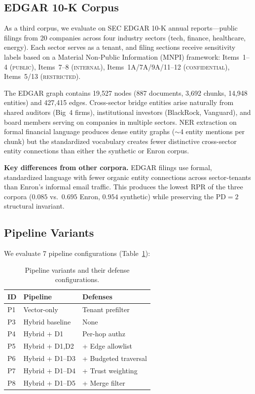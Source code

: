 \documentclass[letterpaper,twocolumn,10pt]{article}
\begin{document}
\subsection{EDGAR 10-K Corpus}
\label{sec:edgar}

As a third corpus, we evaluate on SEC EDGAR 10-K annual reports---public
filings from 20 companies across four industry sectors (tech, finance,
healthcare, energy). Each sector serves as a tenant, and filing sections
receive sensitivity labels based on a Material Non-Public Information
(MNPI) framework: Items~1--4 (\textsc{public}), Items~7--8
(\textsc{internal}), Items~1A/7A/9A/11--12 (\textsc{confidential}),
Items~5/13 (\textsc{restricted}).

The EDGAR graph contains 19{,}527 nodes (887 documents, 3{,}692 chunks,
14{,}948 entities) and 427{,}415 edges. Cross-sector bridge entities
arise naturally from shared auditors (Big~4 firms), institutional
investors (BlackRock, Vanguard), and board members serving on companies
in multiple sectors. NER extraction on formal financial language produces
dense entity graphs ($\sim$4 entity mentions per chunk) but the
standardized vocabulary creates fewer distinctive cross-sector entity
connections than either the synthetic or Enron corpus.

\textbf{Key differences from other corpora.} EDGAR filings use formal,
standardized language with fewer organic entity connections across
sector-tenants than Enron's informal email traffic. This produces the
lowest RPR of the three corpora ($0.085$ vs.\ $0.695$ Enron, $0.954$
synthetic) while preserving the $\text{PD} = 2$ structural invariant.

\subsection{Pipeline Variants}

We evaluate 7 pipeline configurations (Table~\ref{tab:variants}):

\begin{table}[t]
\centering
\caption{Pipeline variants and their defense configurations.}
\label{tab:variants}
\small
\begin{tabular}{l|l|l}
\toprule
\textbf{ID} & \textbf{Pipeline} & \textbf{Defenses} \\
\midrule
P1 & Vector-only & Tenant prefilter \\
P3 & Hybrid baseline & None \\
P4 & Hybrid + D1 & Per-hop authz \\
P5 & Hybrid + D1,D2 & + Edge allowlist \\
P6 & Hybrid + D1--D3 & + Budgeted traversal \\
P7 & Hybrid + D1--D4 & + Trust weighting \\
P8 & Hybrid + D1--D5 & + Merge filter \\
\bottomrule
\end{tabular}
\end{table}
\end{document}

